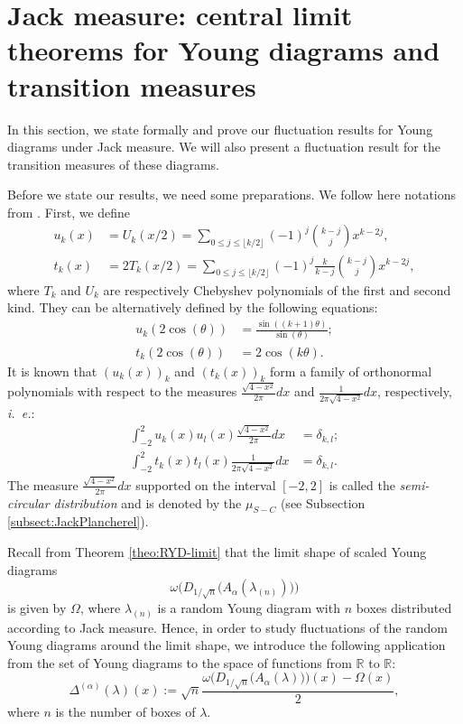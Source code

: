 \documentclass[11pt]{amsart}
\theoremstyle{plain}
\theoremstyle{remark}
\newcommand{\RR}{\mathbb{R}}
\begin{document}
\section{Jack measure: central limit theorems for Young diagrams and transition measures}
\label{sect:CLT2}

In this section, we state formally and prove our fluctuation results
for Young diagrams under Jack measure.
We will also present a fluctuation result for the transition measures of these diagrams.

Before we state our results, we need some preparations.
We follow here notations from \cite[Sections 7 and 8]{IvanovOlshanski2002}.
First, we define
\begin{align*}
u_k(x) &= U_k(x/2) = \sum_{0 \leq j \leq \lfloor k/2 \rfloor}(-1)^j\binom{k-j}{j}x^{k-2j},\\
 t_k(x) &= 2T_k(x/2) = \sum_{0 \leq j \leq \lfloor k/2 \rfloor}(-1)^j\frac{k}{k-j}\binom{k-j}{j}x^{k-2j},
\end{align*}
where $T_k$ and $U_k$ are respectively Chebyshev polynomials of the first and second kind.
They can be alternatively defined by the following equations:
\begin{align*}
 u_k(2 \cos(\theta)) &= \frac{\sin((k+1)\theta)}{\sin(\theta)};\\
 t_k(2 \cos(\theta)) &= 2 \cos(k\theta).
\end{align*}
It is known that
$\left(u_k(x)\right)_k$ and $\left(t_k(x)\right)_k$ form a family of orthonormal polynomials with respect to the measures $\frac{\sqrt{4-x^2}}{2\pi}dx$ and $\frac{1}{2\pi \sqrt{4-x^2}}dx$, respectively, {\it i.~e.}:
\begin{align*}
 \int^2_{-2} u_k(x)u_l(x)\frac{\sqrt{4-x^2}}{2\pi }dx &= \delta_{k,l};\\
 \int^2_{-2} t_k(x)t_l(x)\frac{1}{2\pi \sqrt{4-x^2}}dx &= \delta_{k,l}.
\end{align*}
The measure $\frac{\sqrt{4-x^2}}{2\pi}dx$ supported on the interval $[-2,2]$ is called the \emph{semi-circular distribution} and is denoted by the $\mu_{S-C}$ (see Subsection \ref{subsect:JackPlancherel}).

Recall from Theorem \ref{theo:RYD-limit} that the limit shape of scaled Young diagrams
$$\omega\bigg(D_{1/\sqrt{n}}\big(A_\alpha(\lambda_{(n)})\big)\bigg)$$ is given by $\Omega$,
where $\lambda_{(n)}$ is a random Young diagram with $n$ boxes distributed according to Jack measure.
Hence, in order to study fluctuations of the random Young diagrams around the limit shape,
we introduce the following application from the set of Young diagrams to the space of functions from $\RR$ to $\RR$:
\[ \Delta^{(\alpha)}(\lambda)(x) := \sqrt{n}\frac{\omega\bigg(D_{1/\sqrt{n}}\big(A_\alpha(\lambda)\big)\bigg)(x)
 - \Omega(x)}{2},
\]
where $n$ is the number of boxes of $\lambda$.
\end{document}
